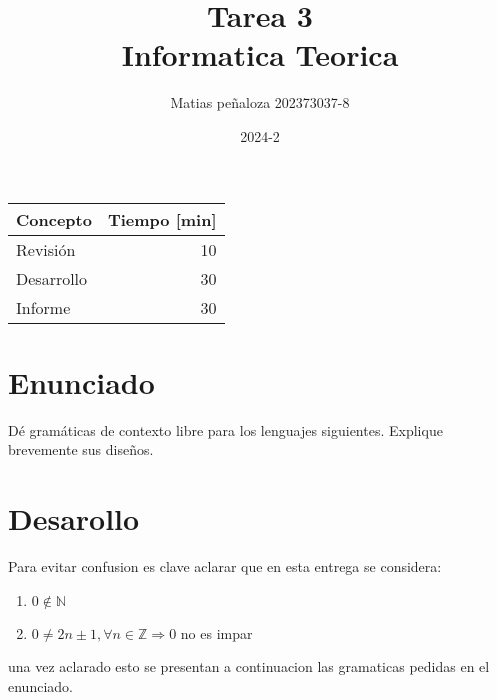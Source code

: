 \documentclass[spanish, draft]{article}
\begin{document}
\title{
    Tarea 3 \\
    Informatica Teorica
}
\author{
    Matias peñaloza
    202373037-8
}
\date{
    2024-2
}
\maketitle

\begin{center}
    \begin{tabular}{|l|r|}
      \hline
      \multicolumn{1}{|c|}{\textbf{Concepto}} &
        \multicolumn{1}{c|}{\textbf{Tiempo [min]}} \\
      \hline
      Revisión & 10\\
      \hline
      Desarrollo    & 30\\
      \hline
      Informe	      & 30\\
      \hline
    \end{tabular}
  \end{center}

\section{Enunciado}
    Dé gramáticas de contexto libre para los lenguajes siguientes.
    Explique brevemente sus diseños.

\section{Desarollo}
    Para evitar confusion es clave aclarar que en esta entrega se considera:
    \begin{enumerate}
        \item $0 \notin \mathbb{N}$
        \item $0 \neq 2n \pm 1, \forall n \in \mathbb{Z} \Rightarrow 0$ no es impar
    \end{enumerate}
    una vez aclarado esto se presentan a continuacion las gramaticas pedidas en el enunciado.
\end{document}
